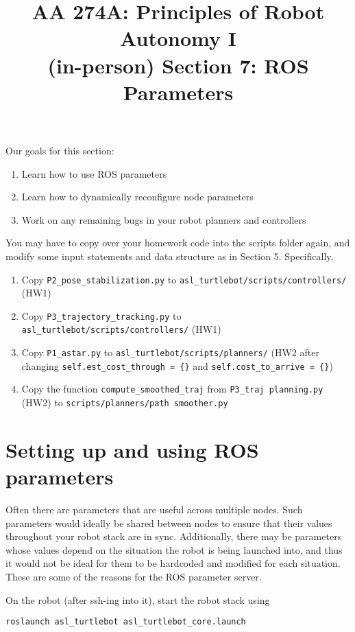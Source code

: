 \documentclass{article}
\title{AA 274A: Principles of Robot Autonomy I \\ (in-person) Section 7: ROS Parameters}
\date{}
\begin{document}
\maketitle
\pagestyle{fancy}


Our goals for this section: \begin{enumerate}
	\item Learn how to use ROS parameters
    \item Learn how to dynamically reconfigure node parameters
    \item Work on any remaining bugs in your robot planners and controllers
\end{enumerate}
You may have to copy over your homework code into the scripts folder again, and modify some input statements and data structure as in Section 5. Specifically,
\begin{enumerate}
    \item Copy \texttt{P2\_pose\_stabilization.py} to \texttt{asl\_turtlebot/scripts/controllers/} (HW1)
    \item Copy \texttt{P3\_trajectory\_tracking.py} to \texttt{asl\_turtlebot/scripts/controllers/} (HW1)
    \item Copy \texttt{P1\_astar.py} to \texttt{asl\_turtlebot/scripts/planners/} (HW2 after changing 
\texttt{self.est\_cost\_through = \{\}} and \texttt{self.cost\_to\_arrive = \{\}})
    \item Copy the function \texttt{compute\_smoothed\_traj} from \texttt{P3\_traj planning.py} (HW2) to \texttt{scripts/planners/path smoother.py}
\end{enumerate}

\section{Setting up and using ROS parameters}
Often there are parameters that are useful across multiple nodes. Such parameters would ideally be shared between nodes to ensure that their values throughout your robot stack are in sync. Additionally, there may be parameters whose values depend on the situation the robot is being launched into, and thus it would not be ideal for them to be hardcoded and modified for each situation. These are some of the reasons for the ROS parameter server.

On the robot (after ssh-ing into it), start the robot stack using 
\begin{lstlisting}
roslaunch asl_turtlebot asl_turtlebot_core.launch
\end{lstlisting}
\end{document}
